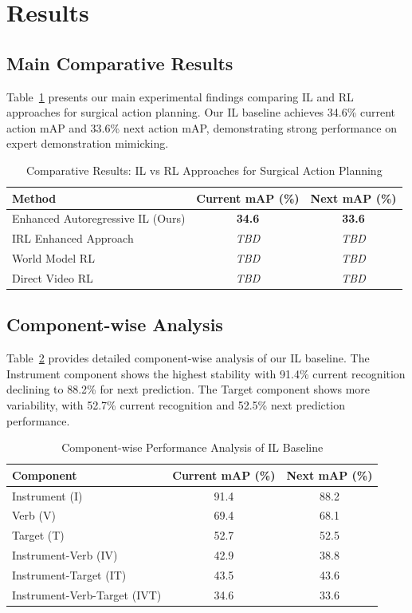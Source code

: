 \documentclass[runningheads]{llncs}
\begin{document}
\section{Results}

\subsection{Main Comparative Results}

Table~\ref{tab:main_results} presents our main experimental findings comparing IL and RL approaches for surgical action planning. Our IL baseline achieves 34.6\% current action mAP and 33.6\% next action mAP, demonstrating strong performance on expert demonstration mimicking.

\begin{table}[h]
\centering
\caption{Comparative Results: IL vs RL Approaches for Surgical Action Planning}
\label{tab:main_results}
\begin{tabular}{lcc}
\toprule
\textbf{Method} & \textbf{Current mAP (\%)} & \textbf{Next mAP (\%)} \\
\midrule
Enhanced Autoregressive IL (Ours) & \textbf{34.6} & \textbf{33.6} \\
\midrule
IRL Enhanced Approach & \textit{TBD} & \textit{TBD} \\
World Model RL & \textit{TBD} & \textit{TBD} \\
Direct Video RL & \textit{TBD} & \textit{TBD} \\
\bottomrule
\end{tabular}
\end{table}

\subsection{Component-wise Analysis}

Table~\ref{tab:component_analysis} provides detailed component-wise analysis of our IL baseline. The Instrument component shows the highest stability with 91.4\% current recognition declining to 88.2\% for next prediction. The Target component shows more variability, with 52.7\% current recognition and 52.5\% next prediction performance.

\begin{table}[h]
\centering
\caption{Component-wise Performance Analysis of IL Baseline}
\label{tab:component_analysis}
\begin{tabular}{lcc}
\toprule
\textbf{Component} & \textbf{Current mAP (\%)} & \textbf{Next mAP (\%)} \\
\midrule
Instrument (I) & 91.4 & 88.2 \\
Verb (V) & 69.4 & 68.1 \\
Target (T) & 52.7 & 52.5 \\
\midrule
Instrument-Verb (IV) & 42.9 & 38.8 \\
Instrument-Target (IT) & 43.5 & 43.6 \\
Instrument-Verb-Target (IVT) & 34.6 & 33.6 \\
\bottomrule
\end{tabular}
\end{table}
\end{document}
